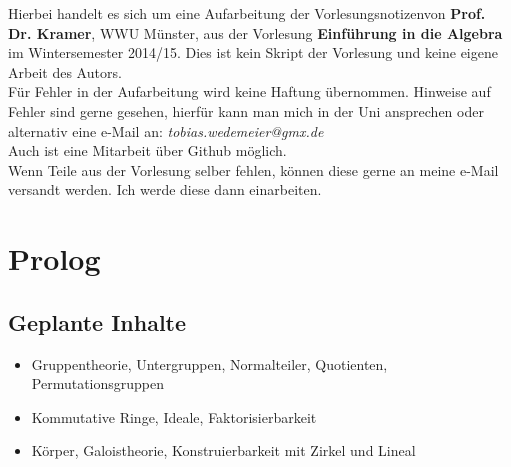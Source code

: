 

\newcommand{\vorlesung}{Einführung in die Algebra}
\newcommand{\Prof}{Prof. Dr. Kramer}
\newcommand{\subt}{Aufarbeitung der Vorlesungsnotizen}





\maketitle
\thispagestyle{empty}
\cleardoubleoddemptypage

\thispagestyle{empty}
\vspace*{\fill}
\begin{center}
	Hierbei handelt es sich um eine \subt von \textbf{\Prof}, WWU Münster, aus der Vorlesung \textbf{\vorlesung} im Wintersemester 2014/15. 
	Dies ist kein Skript der Vorlesung und keine eigene Arbeit des Autors.\\
	\vspace{2cm}
	Für Fehler in der Aufarbeitung wird keine Haftung übernommen. 
	Hinweise auf Fehler sind gerne gesehen, hierfür kann man mich in der Uni ansprechen oder alternativ eine e-Mail an: \textit{tobias.wedemeier@gmx.de}\\
	Auch ist eine Mitarbeit über Github möglich.\\
	\vspace{2cm}
	Wenn Teile aus der Vorlesung selber fehlen, können diese gerne an meine e-Mail versandt werden. 
	Ich werde diese dann einarbeiten.\\
\end{center}
\vspace*{\fill}
\newpage


\tableofcontents
\cleardoubleoddemptypage %


\thispagestyle{empty}
\section*{Prolog}  %
\label{sec:prolog_alg}
\subsection*{Geplante Inhalte}
\begin{itemize}
	\item Gruppentheorie, Untergruppen, Normalteiler, Quotienten, Permutationsgruppen
	\item Kommutative Ringe, Ideale, Faktorisierbarkeit
	\item Körper, Galoistheorie, Konstruierbarkeit mit Zirkel und Lineal
\end{itemize}

